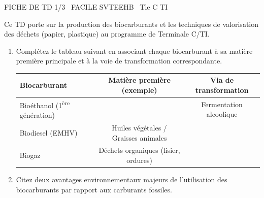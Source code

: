 \documentclass[11pt]{article}
\begin{document}
\begin{tcolorbox}[enhanced,colback=popink,colframe=popink,arc=10pt,boxrule=0pt,left=12pt,right=12pt,top=9pt,bottom=9pt]
{\color{white}\popxbold\small FICHE DE TD 1/3 \textbullet\ FACILE \hfill SVTEEHB \textbullet\ Tle C TI\par}
\end{tcolorbox}
\vspace{4pt}
Ce TD porte sur la production des biocarburants et les techniques de valorisation des déchets (papier, plastique) au programme de Terminale C/TI.

\begin{exercice}
\begin{enumerate}
    \item Complétez le tableau suivant en associant chaque biocarburant à sa matière première principale et à la voie de transformation correspondante.
    \begin{tabular}{|l|c|c|}
    \hline
    \textbf{Biocarburant} & \textbf{Matière première (exemple)} & \textbf{Via de transformation} \\
    \hline
    Bioéthanol (1\textsuperscript{ère} génération) &  & Fermentation alcoolique \\
    \hline
    Biodiesel (EMHV) & Huiles végétales / Graisses animales &  \\
    \hline
    Biogaz & Déchets organiques (lisier, ordures) &  \\
    \hline
    \end{tabular}
    \item Citez deux avantages environnementaux majeurs de l'utilisation des biocarburants par rapport aux carburants fossiles.
\end{enumerate}
\end{exercice}
\end{document}
